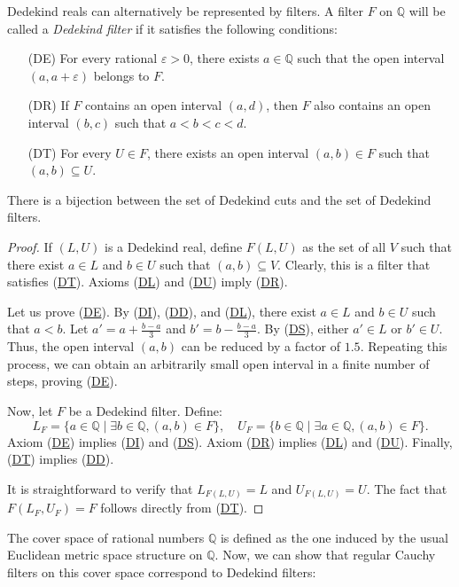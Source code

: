 \documentclass[reqno]{amsart}
\newcommand{\axitem}[1]{\phantomsection \label{ax:#1}}
\newcommand{\axref}[1]{(\hyperref[ax:#1]{#1})}
\theoremstyle{definition}
\theoremstyle{remark}
\numberwithin{figure}{section}
\begin{document}
Dedekind reals can alternatively be represented by filters.
A filter $F$ on $\mathbb{Q}$ will be called a \emph{Dedekind filter} if it satisfies the following conditions:
\begin{itemize}
\item[(DE)] \axitem{DE} For every rational $\varepsilon > 0$, there exists $a \in \mathbb{Q}$ such that the open interval $(a, a + \varepsilon)$ belongs to $F$.
\item[(DR)] \axitem{DR} If $F$ contains an open interval $(a,d)$, then $F$ also contains an open interval $(b,c)$ such that $a < b < c < d$.
\item[(DT)] \axitem{DT} For every $U \in F$, there exists an open interval $(a,b) \in F$ such that $(a,b) \subseteq U$.
\end{itemize}

\begin{prop}
There is a bijection between the set of Dedekind cuts and the set of Dedekind filters.
\end{prop}
\begin{proof}
If $(L,U)$ is a Dedekind real, define $F(L,U)$ as the set of all $V$ such that there exist $a \in L$ and $b \in U$ such that $(a,b) \subseteq V$.
Clearly, this is a filter that satisfies \axref{DT}.
Axioms \axref{DL} and \axref{DU} imply \axref{DR}.

Let us prove \axref{DE}.
By \axref{DI}, \axref{DD}, and \axref{DL}, there exist $a \in L$ and $b \in U$ such that $a < b$.
Let $a' = a + \frac{b - a}{3}$ and $b' = b - \frac{b - a}{3}$.
By \axref{DS}, either $a' \in L$ or $b' \in U$.
Thus, the open interval $(a,b)$ can be reduced by a factor of $1.5$.
Repeating this process, we can obtain an arbitrarily small open interval in a finite number of steps, proving \axref{DE}.

Now, let $F$ be a Dedekind filter.
Define:
\[ L_F = \{ a \in \mathbb{Q} \mid \exists b \in \mathbb{Q}, (a,b) \in F \}, \quad U_F = \{ b \in \mathbb{Q} \mid \exists a \in \mathbb{Q}, (a,b) \in F \}. \]
Axiom \axref{DE} implies \axref{DI} and \axref{DS}.
Axiom \axref{DR} implies \axref{DL} and \axref{DU}.
Finally, \axref{DT} implies \axref{DD}.

It is straightforward to verify that $L_{F(L,U)} = L$ and $U_{F(L,U)} = U$.
The fact that $F(L_F,U_F) = F$ follows directly from \axref{DT}.
\end{proof}

The cover space of rational numbers $\mathbb{Q}$ is defined as the one induced by the usual Euclidean metric space structure on $\mathbb{Q}$.
Now, we can show that regular Cauchy filters on this cover space correspond to Dedekind filters:
\end{document}
